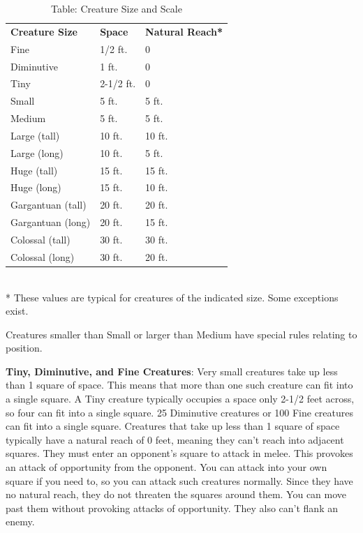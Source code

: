 \begin{table}[]
\sffamily
\caption{Table: Creature Size and Scale}
\begin{tabular}{lll}
\textbf{Creature Size} & \textbf{Space} & \textbf{Natural Reach*}\\
Fine & 1/2 ft. & 0 \\
 Diminutive & 1 ft. & 0 \\
 Tiny & 2-1/2 ft. & 0 \\
 Small & 5 ft. & 5 ft. \\
 Medium & 5 ft. & 5 ft. \\
 Large (tall) & 10 ft. & 10 ft. \\
 Large (long) & 10 ft. & 5 ft. \\
 Huge (tall) & 15 ft. & 15 ft. \\
 Huge (long) & 15 ft. & 10 ft. \\
 Gargantuan (tall) & 20 ft. & 20 ft. \\
 Gargantuan (long) & 20 ft. & 15 ft. \\
 Colossal (tall) & 30 ft. & 30 ft. \\
 Colossal (long) & 30 ft. & 20 ft.\\
\end{tabular}\\
* These values are typical for creatures of the indicated size. Some exceptions exist.\\
\end{table}
				
Creatures smaller than Small or larger than Medium have special rules relating to position. 
				
\textbf{Tiny, Diminutive, and Fine Creatures}: Very small creatures take up less than 1 square of space. This means that more than one such creature can fit into a single square. A Tiny creature typically occupies a space only 2-1/2 feet across, so four can fit into a single square. 25 Diminutive creatures or 100 Fine creatures can fit into a single square. Creatures that take up less than 1 square of space typically have a natural reach of 0 feet, meaning they can't reach into adjacent squares. They must enter an opponent's square to attack in melee. This provokes an attack of opportunity from the opponent. You can attack into your own square if you need to, so you can attack such creatures normally. Since they have no natural reach, they do not threaten the squares around them. You can move past them without provoking attacks of opportunity. They also can't flank an enemy.
				
